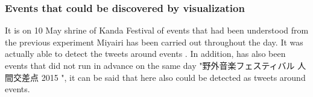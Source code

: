 
\subsubsection{Events that could be discovered by visualization}
It is on 10 May shrine of Kanda Festival of events that had been understood from the previous experiment Miyairi has been carried out throughout the day.
It was actually able to detect the tweets around events \cite{webpage_kanda}.
In addition, has also been events that did not run in advance on the same day "野外音楽フェスティバル 人間交差点 2015 \cite{webpage_nkfes}", it can be said that here also could be detected as tweets around events.

